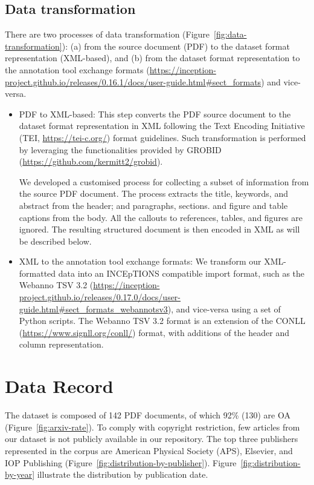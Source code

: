 \documentclass[fleqn,10pt]{wlscirep}
\begin{document}
\subsection*{Data transformation}
\label{subsec:transformation-of-data}
There are two processes of data transformation (Figure~\ref{fig:data-transformation}): (a) from the source document (PDF) to the dataset format representation (XML-based), and (b) from the dataset format representation to the annotation tool exchange formats (\url{https://inception-project.github.io/releases/0.16.1/docs/user-guide.html\#sect_formats}) and vice-versa. 
\begin{itemize}
    \item PDF to XML-based: This step converts the PDF source document to the dataset format representation in XML following the Text Encoding Initiative (TEI, \url{https://tei-c.org/}) format guidelines. 
    Such transformation is performed by leveraging the functionalities provided by GROBID (\url{https://github.com/kermitt2/grobid}).
    
    We developed a customised process for collecting a subset of information from the source PDF document.
    The process extracts the title, keywords, and abstract from the header; and paragraphs, sections. and figure and table captions from the body.
    All the callouts to references, tables, and figures are ignored.
    The resulting structured document is then encoded in XML as will be described below. 
    \item XML to the annotation tool exchange formats: We transform our XML-formatted data into an INCEpTIONS compatible import format, such as the Webanno TSV 3.2 (\url{https://inception-project.github.io/releases/0.17.0/docs/user-guide.html\#sect_formats_webannotsv3}), and vice-versa using a set of Python scripts. 
    The Webanno TSV 3.2 format is an extension of the CONLL (\url{https://www.signll.org/conll/}) format, with additions of the header and column representation.
\end{itemize}

\section*{Data Record}
\label{sec:data-record}
The dataset is composed of 142 PDF documents, of which 92\% (130) are OA (Figure~\ref{fig:arxiv-rate}).
To comply with copyright restriction, few articles from our dataset is not publicly available in our repository. 
The top three publishers represented in the corpus are American Physical Society (APS), Elsevier, and IOP Publishing (Figure~\ref{fig:distribution-by-publisher}).
Figure~\ref{fig:distribution-by-year} illustrate the distribution by publication date.
\end{document}
